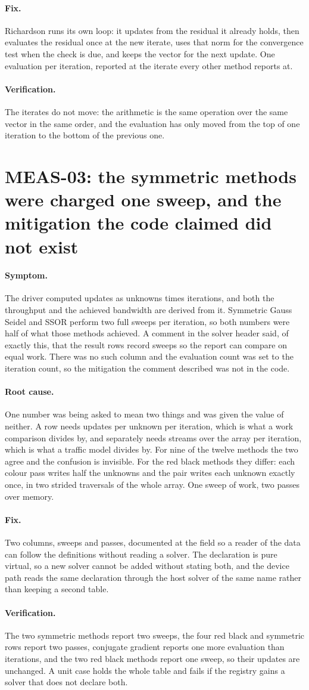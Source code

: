 \documentclass[11pt,a4paper]{report}
\newcommand{\symptom}[1]{\paragraph{Symptom.}#1}
\newcommand{\rootcause}[1]{\paragraph{Root cause.}#1}
\newcommand{\fix}[1]{\paragraph{Fix.}#1}
\newcommand{\verification}[1]{\paragraph{Verification.}#1}
\begin{document}
\fix{Richardson runs its own loop: it updates from the residual it already holds,
then evaluates the residual once at the new iterate, uses that norm for the
convergence test when the check is due, and keeps the vector for the next update.
One evaluation per iteration, reported at the iterate every other method reports
at.}

\verification{The iterates do not move: the arithmetic is the same operation over
the same vector in the same order, and the evaluation has only moved from the top
of one iteration to the bottom of the previous one.}

\section{MEAS-03: the symmetric methods were charged one sweep, and the mitigation the code claimed did not exist}

\symptom{The driver computed updates as unknowns times iterations, and both the
throughput and the achieved bandwidth are derived from it. Symmetric Gauss Seidel
and SSOR perform two full sweeps per iteration, so both numbers were half of what
those methods achieved. A comment in the solver header said, of exactly this,
that the result rows record sweeps so the report can compare on equal work. There
was no such column and the evaluation count was set to the iteration count, so
the mitigation the comment described was not in the code.}

\rootcause{One number was being asked to mean two things and was given the value
of neither. A row needs updates per unknown per iteration, which is what a work
comparison divides by, and separately needs streams over the array per iteration,
which is what a traffic model divides by. For nine of the twelve methods the two
agree and the confusion is invisible. For the red black methods they differ: each
colour pass writes half the unknowns and the pair writes each unknown exactly
once, in two strided traversals of the whole array. One sweep of work, two passes
over memory.}

\fix{Two columns, sweeps and passes, documented at the field so a reader of the
data can follow the definitions without reading a solver. The declaration is pure
virtual, so a new solver cannot be added without stating both, and the device
path reads the same declaration through the host solver of the same name rather
than keeping a second table.}

\verification{The two symmetric methods report two sweeps, the four red black and
symmetric rows report two passes, conjugate gradient reports one more evaluation
than iterations, and the two red black methods report one sweep, so their updates
are unchanged. A unit case holds the whole table and fails if the registry gains
a solver that does not declare both.}
\end{document}
